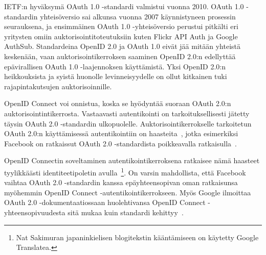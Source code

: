 \documentclass[finnish,gradu]{tktltiki}
\begin{document}
  IETF:n hyväksymä OAuth 1.0 -standardi valmistui vuonna 2010. OAuth 1.0 -standardin yhteisöversio sai alkunsa vuonna 2007 käynnistyneen prosessin seurauksena, ja ensimmäinen OAuth 1.0 -yhteisöversio perustui pitkälti eri yritysten omiin auktorisointitoteutuksiin kuten Flickr API Auth ja Google AuthSub. Standardeina OpenID 2.0 ja OAuth 1.0 eivät jää mitään yhteistä keskenään, vaan auktorisointikerroksen saaminen OpenID 2.0:n edellyttää epävirallisen OAuth 1.0 -laajennoksen käyttämistä. Yksi OpenID 2.0:n heikkouksista ja syistä huonolle levinneisyydelle on ollut kitkainen tuki rajapintakutsujen auktorisoinnille.

  OpenID Connect voi onnistua, koska se hyödyntää suoraan OAuth 2.0:n auktorisointintikerrosta. Vastaavasti autentikointi on tarkoituksellisesti jätetty täysin OAuth 2.0 -standardin ulkopuolelle. Auktorisointikerrokselle tarkoitetun OAuth 2.0:n käyttämisessä autentikointiin on haasteita~\cite{bradley_oauth_authentication_problem_2012, bradley_oauth_implicit_flow_vulnerability_2012}, jotka esimerkiksi Facebook on ratkaissut OAuth 2.0 -standardista poikkeavalla ratkaisulla~\cite{bradley_facebook_id_tokens_2012, facebook_oauth2_signed_request}.

  OpenID Connectin soveltaminen autentikointikerroksena ratkaisee nämä haasteet tyylikkäästi identiteetipoletin avulla~\cite{bradley_openid_c_id_token_2012, bradley_facebook_for_authentication_2012 sakimura_oauth_authentication_problem_2012}\footnote{Nat Sakimuran japaninkielisen blogitekstin kääntämiseen on käytetty Google Translatea.}. On varsin mahdollista, että Facebook vaihtaa OAuth 2.0 -standardin kanssa epäyhteensopivan oman ratkaisunsa~\cite{bradley_facebook_id_tokens_2012, facebook_oauth2_signed_request} myöhemmin OpenID Connect -autentikointikerrokseen. Myös Google ilmoittaa OAuth 2.0 -dokumentaatiossaan huolehtivansa OpenID Connect -yhteensopivuudesta sitä mukaa kuin standardi kehittyy~\cite{google_oauth2_login}.



\end{document}
